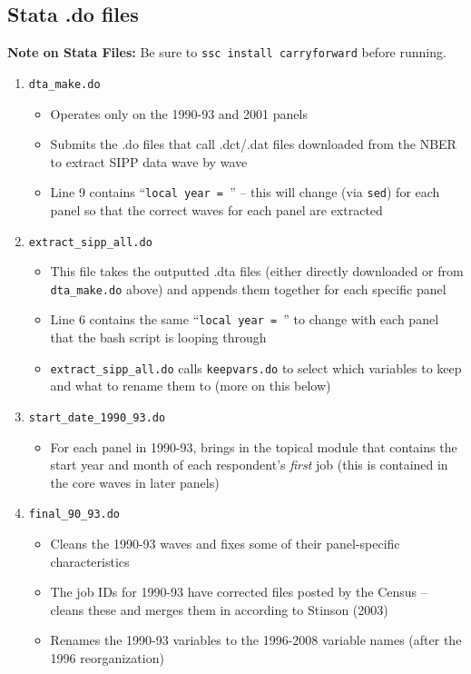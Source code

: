 \documentclass{article}
\begin{document}
\subsection{Stata .do files}
{\bf Note on Stata Files:} Be sure to {\tt ssc install carryforward} before running.
\begin{enumerate}
\item {\tt dta\_make.do}
	\begin{itemize}
	\item Operates only on the 1990-93 and 2001 panels
	\item Submits the .do files that call .dct/.dat files downloaded from the NBER to extract SIPP data wave by wave
	\item Line 9 contains ``{\tt local year = }'' -- this will change (via {\tt sed}) for each panel so that the correct waves for each panel are extracted
	\end{itemize}
\item {\tt extract\_sipp\_all.do}
	\begin{itemize}
	\item This file takes the outputted .dta files (either directly downloaded or from {\tt dta\_make.do} above) and appends them together for each specific panel
	\item Line 6 contains the same ``{\tt local year = }'' to change with each panel that the bash script is looping through
	\item {\tt extract\_sipp\_all.do} calls {\tt keepvars.do} to select which variables to keep and what to rename them to (more on this below)
	\end{itemize}
\item {\tt start\_date\_1990\_93.do}
	\begin{itemize}
	\item For each panel in 1990-93, brings in the topical module that contains the start year and month of each respondent's {\it first} job (this is contained in the core waves in later panels)
	\end{itemize}
\item {\tt final\_90\_93.do}
	\begin{itemize}
	\item Cleans the 1990-93 waves and fixes some of their panel-specific characteristics
	\item The job IDs for 1990-93 have corrected files posted by the Census -- cleans these and merges them in according to Stinson (2003)
	\item Renames the 1990-93 variables to the 1996-2008 variable names (after the 1996 reorganization)

\end{itemize}
\end{enumerate}
\end{document}
